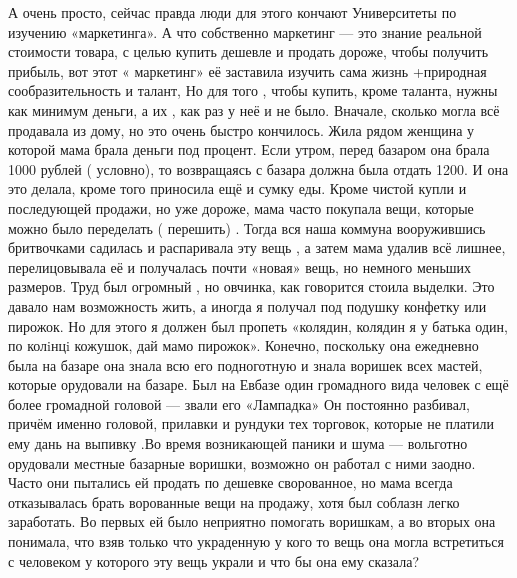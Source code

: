 А очень просто, сейчас правда люди для этого кончают Университеты по изучению
«маркетинга». А что собственно маркетинг — это знание реальной стоимости
товара, с целью купить дешевле и продать дороже, чтобы получить прибыль, вот
этот « маркетинг» её заставила изучить сама  жизнь +природная сообразительность
и талант, Но для того , чтобы купить, кроме таланта, нужны как минимум деньги,
а их , как раз у неё и не было. Вначале, сколько могла всё продавала из дому,
но это очень быстро кончилось.  Жила рядом женщина у которой мама  брала деньги
под процент. Если утром, перед базаром она брала 1000 рублей ( условно), то
возвращаясь с базара должна была отдать 1200. И она это делала, кроме того
приносила ещё и сумку еды. Кроме чистой купли и последующей продажи, но уже
дороже, мама часто покупала вещи, которые можно было переделать ( перешить) .
Тогда вся наша коммуна вооружившись бритвочками  садилась и распаривала эту
вещь , а затем мама удалив  всё лишнее, перелицовывала её и получалась почти
«новая» вещь, но немного меньших размеров. Труд был огромный , но овчинка, как
говорится стоила выделки. Это давало нам возможность жить, а иногда я получал
под подушку конфетку или пирожок. Но для этого я должен был пропеть «колядин,
колядин я  у батька один, по колiнцi кожушок, дай мамо пирожок». Конечно,
поскольку она ежедневно была на базаре она знала всю его подноготную и знала
воришек всех мастей, которые орудовали на базаре. Был на Евбазе один громадного
вида человек  с  ещё более громадной головой — звали его  «Лампадка» Он
постоянно разбивал, причём именно головой, прилавки и рундуки тех торговок,
которые не платили ему дань на выпивку .Во время возникающей паники и шума —
вольготно  орудовали местные базарные воришки, возможно он работал с ними
заодно. Часто они пытались ей продать по дешевке сворованное, но мама всегда
отказывалась брать ворованные вещи на продажу, хотя был соблазн легко
заработать. Во первых ей было неприятно помогать воришкам, а во вторых она
понимала, что взяв только что украденную у кого то вещь  она  могла
встретиться  с человеком у которого эту вещь украли и что бы она ему сказала?

